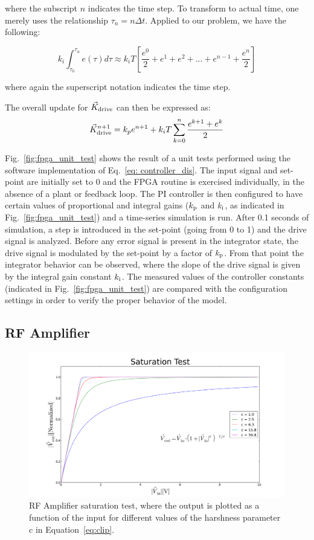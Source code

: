 \documentclass[a4paper,12pt]{article}
\newcommand{\be}{\begin{equation}}
\newcommand{\ee}{\end{equation}}
\begin{document}
\noindent where the subscript $n$ indicates the time step. To transform to actual time, one merely uses the relationship $\tau_{n} = n\Delta t$. Applied to our problem, we have the following: 

\be
k_{i} \int_{\tau_{0}}^{\tau_{n}} e(\tau)d\tau \approx k_{i}T
	      \left[\frac{e^{0}}{2} + e^{1} + e^{2} + ... 
		+ e^{n-1} + \frac{e^{n}}{2} \right]
\ee

\noindent where again the superscript notation indicates the time step. 

The overall update for $\vec{K}_{\rm drive}$ can then be expressed as:
\be \label{eq: controller_dis}
\vec{K}_{\rm drive}^{n+1} = k_{p} e^{n+1} + k_{i}T \sum_{k=0}^{n}\frac{e^{k+1}+e^k}{2}
\ee

Fig.~\ref{fig:fpga_unit_test} shows the result of a unit tests performed using the software implementation of Eq.~\ref{eq: controller_dis}. The input signal and set-point are initially set to 0 and the FPGA routine is exercised individually, in the absence of a plant or feedback loop. The PI controller is then configured to have certain values of proportional and integral gains ($k_{\rm p}$ and $k_{\rm i}$, as indicated in Fig.~\ref{fig:fpga_unit_test}) and a time-series simulation is run. After 0.1 seconds of simulation, a step is introduced in the set-point (going from 0 to 1) and the drive signal is analyzed. Before any error signal is present in the integrator state, the drive signal is modulated by the set-point by a factor of $k_{\rm p}$. From that point the integrator behavior can be observed, where the slope of the drive signal is given by the integral gain constant $k_{\rm i}$. The measured values of the controller constants (indicated in Fig.~\ref{fig:fpga_unit_test}) are compared with the configuration settings in order to verify the proper behavior of the model.

\subsection{RF Amplifier}

\begin{figure}
\centering
\includegraphics[scale=0.35]{../figures/saturation_test.png}
\caption{RF Amplifier saturation test, where the output is plotted as a function of the input for different values of the harshness parameter c in Equation~\ref{eq:clip}.}
\label{fig:saturation_test}
\end{figure}
\end{document}
